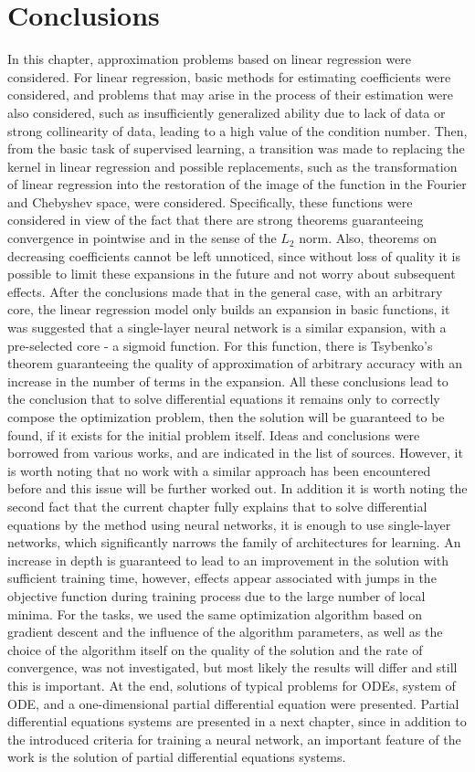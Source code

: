 \section*{Conclusions}
In this chapter, approximation problems based on linear regression were considered. For linear regression, basic methods for estimating coefficients were considered, and problems that may arise in the process of their estimation were also considered, such as insufficiently generalized ability due to lack of data or strong collinearity of data, leading to a high value of the condition number. Then, from the basic task of supervised learning, a transition was made to replacing the kernel in linear regression and possible replacements, such as the transformation of linear regression into the restoration of the image of the function in the Fourier and Chebyshev space, were considered. Specifically, these functions were considered in view of the fact that there are strong theorems guaranteeing convergence in pointwise and in the sense of the $L_2$ norm. Also, theorems on decreasing coefficients cannot be left unnoticed, since without loss of quality it is possible to limit these expansions in the future and not worry about subsequent effects. After the conclusions made that in the general case, with an arbitrary core, the linear regression model only builds an expansion in basic functions, it was suggested that a single-layer neural network is a similar expansion, with a pre-selected core - a sigmoid function. For this function, there is Tsybenko’s theorem guaranteeing the quality of approximation of arbitrary accuracy with an increase in the number of terms in the expansion. All these conclusions lead to the conclusion that to solve differential equations it remains only to correctly compose the optimization problem, then the solution will be guaranteed to be found, if it exists for the initial problem itself. Ideas and conclusions were borrowed from various works, and are indicated in the list of sources. However, it is worth noting that no work with a similar approach has been encountered before and this issue will be further worked out. In addition it is worth noting the second fact that the current chapter fully explains that to solve differential equations by the method using neural networks, it is enough to use single-layer networks, which significantly narrows the family of architectures for learning. An increase in depth is guaranteed to lead to an improvement in the solution with sufficient training time, however, effects appear associated with jumps in the objective function during training process due to the large number of local minima. For the tasks, we used the same optimization algorithm based on gradient descent and the influence of the algorithm parameters, as well as the choice of the algorithm itself on the quality of the solution and the rate of convergence, was not investigated, but most likely the results will differ and still this is important. At the end, solutions of typical problems for ODEs, system of ODE, and a one-dimensional partial differential equation were presented. Partial differential equations systems are presented in a next  chapter, since in addition to the introduced criteria for training a neural network, an important feature of the work is the solution of partial differential equations systems.
